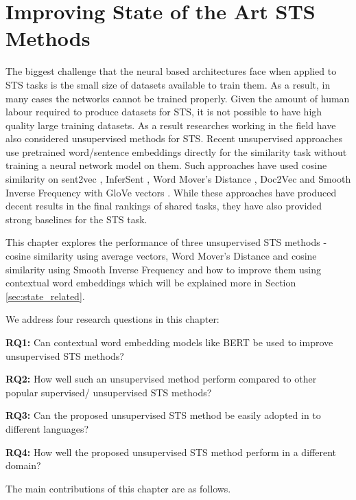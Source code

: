 \chapter{\label{cha:sts_state_of_the_art_methods}Improving State of the Art STS Methods}

The biggest challenge that the neural based architectures face when applied to STS tasks is the small size of datasets available to train them. As a result, in many cases the networks cannot be trained properly. Given the amount of human labour required to produce datasets for STS, it is not possible to have high quality large training datasets. As a result researches working in the field have also considered unsupervised methods for STS. Recent unsupervised approaches use pretrained word/sentence embeddings directly for the similarity task without training a neural network model on them. Such approaches have used cosine similarity on sent2vec \cite{pagliardini-etal-2018-unsupervised}, InferSent \cite{conneau-EtAl:2017:EMNLP2017}, Word Mover's Distance \cite{10.5555/3045118.3045221}, Doc2Vec \cite{10.5555/3044805.3045025} and Smooth Inverse Frequency with GloVe vectors \cite{DBLP:conf/iclr/AroraLM17}. While these approaches have produced decent results in the final rankings of shared tasks, they have also provided strong baselines for the STS task. 

This chapter explores the performance of three unsupervised STS methods - cosine similarity using average vectors, Word Mover's Distance \cite{10.5555/3045118.3045221} and cosine similarity using Smooth Inverse Frequency \cite{DBLP:conf/iclr/AroraLM17} and how to improve them using contextual word embeddings which will be explained more in Section \ref{sec:state_related}. 

We address four research questions in this chapter:

\textbf{RQ1:} Can contextual word embedding models like BERT be used to improve unsupervised STS methods?

\textbf{RQ2:} How well such an unsupervised method perform compared to other popular supervised/ unsupervised STS methods?

\textbf{RQ3:} Can the proposed unsupervised STS method be easily adopted in to different languages?

\textbf{RQ4:} How well the proposed unsupervised STS method perform in a different domain? 


The main contributions of this chapter are as follows.

